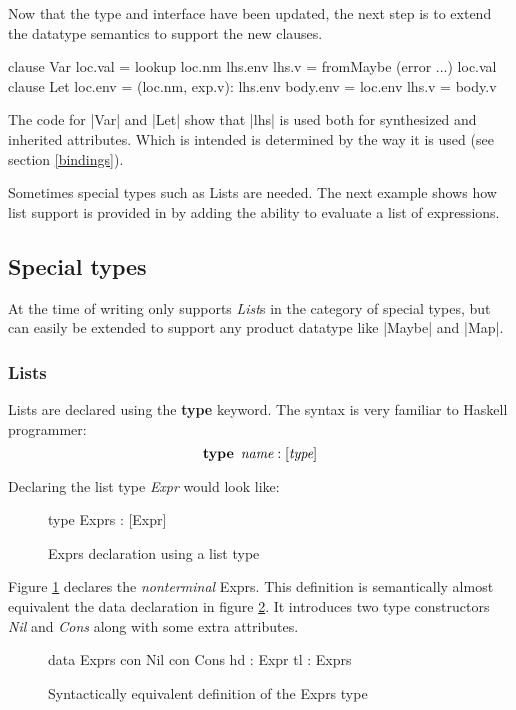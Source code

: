 Now that the type and interface have been updated, the next step is to extend the datatype semantics to support the new clauses.

\begin{code}
   clause Var
     loc.val  = lookup loc.nm lhs.env
     lhs.v    = fromMaybe (error ...) loc.val
   clause Let
     loc.env   = (loc.nm, exp.v): lhs.env
     body.env  = loc.env
     lhs.v     = body.v
\end{code}

The code for |Var| and |Let| show that |lhs| is used both for synthesized and inherited attributes. Which is intended is determined by the way it is used (see section \ref{bindings}).

Sometimes special types such as Lists are needed. The next example shows how list support is provided in \rcore by adding the ability to evaluate a list of expressions.

\subsection{Special types}
At the time of writing \rcore only supports \emph{List}s in the category of special types, but can easily be extended to support any product datatype like |Maybe| and |Map|.

\subsubsection{Lists}
Lists are declared using the \textbf{type} keyword. The syntax is very familiar to Haskell programmer: \[ \textbf{type} \hspace{5pt} \emph{name} : [\emph{type}] \]

Declaring the list type \emph{Expr} would look like:

\begin{figure}[H]
\begin{code}
type Exprs : [Expr]
\end{code}
\caption{Exprs declaration using a list type}
\label{type:exprs}
\end{figure}

Figure \ref{type:exprs} declares the \emph{nonterminal} Exprs. This definition is semantically almost equivalent the data declaration in figure \ref{type:lists}. It introduces two type constructors \emph{Nil} and \emph{Cons} along with some extra attributes.

\begin{figure}[H]
\begin{code}
data Exprs
  con Nil
  con Cons
    hd  : Expr
    tl  : Exprs
\end{code}
\caption{Syntactically equivalent definition of the Exprs type}
\label{type:lists}
\end{figure}

